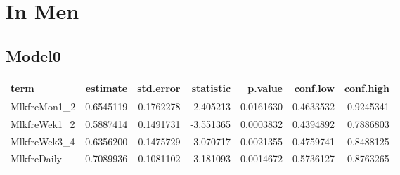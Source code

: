 \documentclass[]{article}
\newenvironment{Shaded}{\begin{snugshade}}{\end{snugshade}}
\newcommand{\CommentTok}[1]{\textcolor[rgb]{0.56,0.35,0.01}{\textit{#1}}}
\newcommand{\DataTypeTok}[1]{\textcolor[rgb]{0.13,0.29,0.53}{#1}}
\newcommand{\KeywordTok}[1]{\textcolor[rgb]{0.13,0.29,0.53}{\textbf{#1}}}
\newcommand{\NormalTok}[1]{#1}
\newcommand{\OperatorTok}[1]{\textcolor[rgb]{0.81,0.36,0.00}{\textbf{#1}}}
\newcommand{\OtherTok}[1]{\textcolor[rgb]{0.56,0.35,0.01}{#1}}
\newcommand{\StringTok}[1]{\textcolor[rgb]{0.31,0.60,0.02}{#1}}
\begin{document}
\begin{Shaded}
\end{Shaded}

\hypertarget{in-men-2}{%
\section{In Men}\label{in-men-2}}

\hypertarget{model0-4}{%
\subsection{Model0}\label{model0-4}}

\begin{Shaded}
\end{Shaded}

\begin{longtable}[]{@{}lrrrrrr@{}}
\toprule
term & estimate & std.error & statistic & p.value & conf.low &
conf.high\tabularnewline
\midrule
\endhead
MlkfreMon1\_2 & 0.6545119 & 0.1762278 & -2.405213 & 0.0161630 &
0.4633532 & 0.9245341\tabularnewline
MlkfreWek1\_2 & 0.5887414 & 0.1491731 & -3.551365 & 0.0003832 &
0.4394892 & 0.7886803\tabularnewline
MlkfreWek3\_4 & 0.6356200 & 0.1475729 & -3.070717 & 0.0021355 &
0.4759741 & 0.8488125\tabularnewline
MlkfreDaily & 0.7089936 & 0.1081102 & -3.181093 & 0.0014672 & 0.5736127
& 0.8763265\tabularnewline
\bottomrule
\end{longtable}
\end{document}
